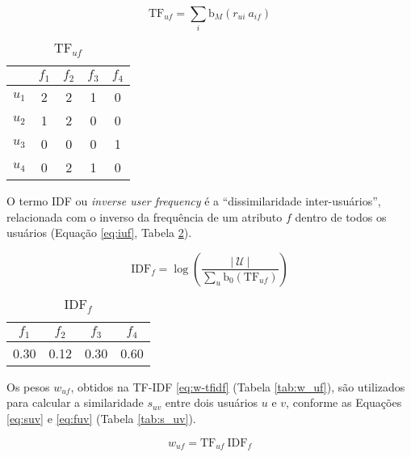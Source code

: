 \begin{equation}
\label{eq:tf} 
    \mathrm{TF}_{uf}  = \sum_{i}{\mathrm{b}_M\left(r_{ui}~a_{if}\right)} 
\end{equation} 

\begin{table}[p]
\begin{center}
    \caption{$\mathrm{TF}_{uf}$}
    \label{tab:tf_uf}
    \begin{tabular}{ | c | c | c | c | c | } 
    \hline
     & $f_1$ & $f_2$ & $f_3$ & $f_4$   \\ \hline
     $u_1$ & 2 & 2 & 1 & 0  \\ \hline
     $u_2$ & 1 & 2 & 0 & 0  \\ \hline
     $u_3$ & 0 & 0 & 0 & 1  \\ \hline
     $u_4$ & 0 & 2 & 1 & 0  \\ \hline
    \end{tabular}
\end{center}
\end{table}

O termo IDF ou \textit{inverse user frequency} é a ``dissimilaridade inter-usuários'', relacionada com o inverso da frequência de um atributo $f$ dentro de todos os usuários (Equação \ref{eq:iuf}, Tabela \ref{tab:idf_f}).

\begin{equation}
\label{eq:iuf} 
    \mathrm{IDF}_{f} = \log \left( \frac{\left|~\mathcal{U}~\right|}{\sum_{u}{\mathrm{b}_0\left(\mathrm{TF}_{uf}\right)}} \right)
\end{equation} 

\begin{table}[p]
\begin{center}
    \caption{$\mathrm{IDF}_{f}$}
    \label{tab:idf_f}
    \begin{tabular}{ | c | c | c | c | } 
    \hline
     $f_1$ & $f_2$ & $f_3$ & $f_4$   \\ \hline
     0.30 & 0.12 & 0.30 & 0.60  \\ \hline
     \end{tabular}
\end{center}
\end{table}

Os pesos $w_{uf}$, obtidos na TF-IDF \ref{eq:w-tfidf} (Tabela \ref{tab:w_uf}), são utilizados para calcular a similaridade $s_{uv}$ entre dois usuários $u$ e $v$, conforme as Equações \ref{eq:suv} e \ref{eq:fuv} (Tabela \ref{tab:s_uv}).

\begin{equation}
\label{eq:w-tfidf} 
    w_{uf} = \mathrm{TF}_{uf}~\mathrm{IDF}_{f}
\end{equation} 

